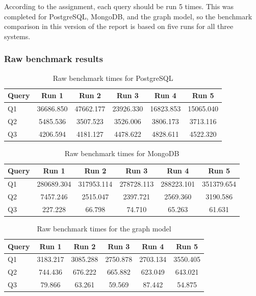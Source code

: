 \documentclass[11pt,a4paper]{article}
\begin{document}
According to the assignment, each query should be run 5 times. This was completed for PostgreSQL, MongoDB, and the graph model, so the benchmark comparison in this version of the report is based on five runs for all three systems.

\subsubsection{Raw benchmark results}
\begin{table}[htbp]
    \centering
    \caption{Raw benchmark times for PostgreSQL}
    \begin{tabular}{lccccc}
        \hline
        Query & Run 1 & Run 2 & Run 3 & Run 4 & Run 5 \\
        \hline
        Q1 & 36686.850 & 47662.177 & 23926.330 & 16823.853 & 15065.040 \\
        Q2 & 5485.536 & 3507.523 & 3526.006 & 3806.173 & 3713.116 \\
        Q3 & 4206.594 & 4181.127 & 4478.622 & 4828.611 & 4522.320 \\
        \hline
    \end{tabular}
\end{table}

\begin{table}[htbp]
    \centering
    \caption{Raw benchmark times for MongoDB}
    \begin{tabular}{lccccc}
        \hline
        Query & Run 1 & Run 2 & Run 3 & Run 4 & Run 5 \\
        \hline
        Q1 & 280689.304 & 317953.114 & 278728.113 & 288223.101 & 351379.654 \\
        Q2 & 7457.246 & 2515.047 & 2397.721 & 2569.360 & 3190.586 \\
        Q3 & 227.228 & 66.798 & 74.710 & 65.263 & 61.631 \\
        \hline
    \end{tabular}
\end{table}

\begin{table}[htbp]
    \centering
    \caption{Raw benchmark times for the graph model}
    \begin{tabular}{lccccc}
        \hline
        Query & Run 1 & Run 2 & Run 3 & Run 4 & Run 5 \\
        \hline
        Q1 & 3183.217 & 3085.288 & 2750.878 & 2703.134 & 3550.405 \\
        Q2 & 744.436 & 676.222 & 665.882 & 623.049 & 643.021 \\
        Q3 & 79.866 & 63.261 & 59.569 & 87.442 & 54.875 \\
        \hline
    \end{tabular}
\end{table}
\end{document}
